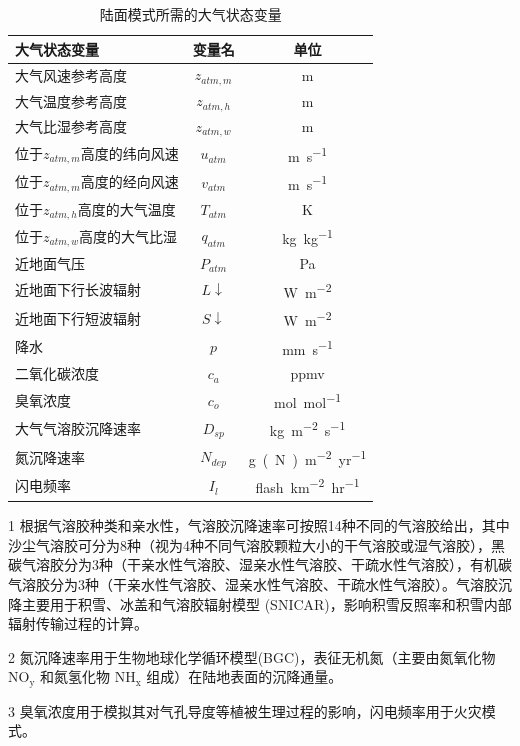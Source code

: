 {
\begin{table}[]
\centering
\caption{陆面模式所需的大气状态变量}
\label{tab:陆面模式所需的大气状态变量}
\begin{threeparttable}
\begin{tabular}{lcc}
\toprule
大气状态变量               & 变量名           & 单位           \\  \midrule
大气风速参考高度             & $z_{atm,m}$   & m            \\
大气温度参考高度             & $z_{atm,h}$   & m            \\
大气比湿参考高度             & $z_{atm,w}$   & m            \\
位于$z_{atm,m}$高度的纬向风速 & $u_{atm}$     & \unit{m.s^{-1}}   \\
位于$z_{atm,m}$高度的经向风速 & $v_{atm}$     & \unit{m.s^{-1}}   \\
位于$z_{atm,h}$高度的大气温度 & $T_{atm}$     & K            \\
位于$z_{atm,w}$高度的大气比湿 & $q_{atm}$     & \unit{kg.kg^{-1}} \\
近地面气压                & $P_{atm}$     & Pa           \\
近地面下行长波辐射            & $L\downarrow$ & \unit{W.m^{-2}}   \\
近地面下行短波辐射            & $S\downarrow$ & \unit{W.m^{-2}}   \\
降水                   & $p$           & \unit{mm.s^{-1}}      \\
二氧化碳浓度               & $c_a$         & ppmv         \\
臭氧浓度                 & $c_o$         & \unit{mol.mol^{-1}}  \\
大气气溶胶沉降速率        & $D_{sp}$      & \unit{kg.m^{-2}.s^{-1}}  \\
氮沉降速率                & $N_{dep}$     & \unit{g(N).m^{-2}.yr^{-1}}   \\
闪电频率                 & $I_l$         & \unit{flash.km^{-2}.hr^{-1}} \\ \bottomrule    
\end{tabular}
\begin{tablenotes}
\footnotesize
\item[1] 根据气溶胶种类和亲水性，气溶胶沉降速率可按照14种不同的气溶胶给出，其中沙尘气溶胶可分为8种（视为4种不同气溶胶颗粒大小的干气溶胶或湿气溶胶），黑碳气溶胶分为3种（干亲水性气溶胶、湿亲水性气溶胶、干疏水性气溶胶），有机碳气溶胶分为3种（干亲水性气溶胶、湿亲水性气溶胶、干疏水性气溶胶）。气溶胶沉降主要用于积雪、冰盖和气溶胶辐射模型 (SNICAR)，影响积雪反照率和积雪内部辐射传输过程的计算。 
\item[2] 氮沉降速率用于生物地球化学循环模型(BGC)，表征无机氮（主要由氮氧化物 $\mathrm{NO_y}$ 和氮氢化物 $\mathrm{NH_x}$ 组成）在陆地表面的沉降通量。
\item[3] 臭氧浓度用于模拟其对气孔导度等植被生理过程的影响，闪电频率用于火灾模式。
\end{tablenotes}
\end{threeparttable}
\end{table}
}
